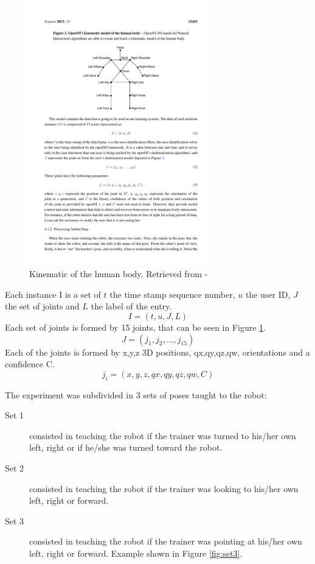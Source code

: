 \begin{figure}[h]
\includegraphics[width=8cm]{Figures/Skeleton}
\centering
\caption{Kinematic of the human body. Retrieved from \cite{Gonzalez-Pacheco2013}- \label{fig:kine}}
\end{figure}
 
Each instance I is a set of $t$ the time stamp sequence number, $u$ the user ID, $J$ the set of joints and $L$ the label of the entry.\label{eq-4.1}
\begin{equation} 
I = (t,u,J,L)
\end{equation}
Each set of joints is formed by 15 joints, that can be seen in Figure \ref{fig:kine}.\label{eq-4.2}
\begin{equation} 
J = (j_1,j_2,...,j_15) 
\end{equation}
Each of the joints is formed by x,y,z 3D positions, qx,qy,qz,qw, orientations and a confidence C.\label{eq-4.3}
\begin{equation} 
j_i = (x,y,z,qx,qy,qz,qw,C) 
\end{equation}

The experiment was subdivided in 3 sets of poses taught to the robot:

\begin{description}
\item[Set 1] consisted in teaching the robot if the trainer was turned to his/her own left, right or if he/she was turned toward the robot.
\item[Set 2] consisted in teaching the robot if the trainer was looking to his/her own left, right or forward.
\item[Set 3]consisted in teaching the robot if the trainer was pointing at his/her own left, right or forward. Example shown in Figure \ref{fig:set3}.
\end{description}

